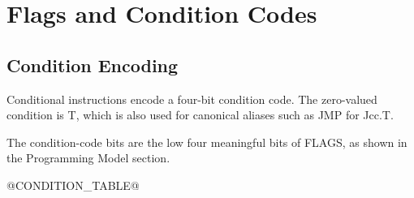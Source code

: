 \clearpage
\section{Flags and Condition Codes}\label{page:flags-and-condition-codes}

\subsection{Condition Encoding}

Conditional instructions encode a four-bit condition code. The zero-valued condition is T, which is also used for
canonical aliases such as JMP for Jcc.T.

The condition-code bits are the low four meaningful bits of FLAGS, as shown in the Programming Model section.

@CONDITION_TABLE@
\label{table:condition-code-encoding}
